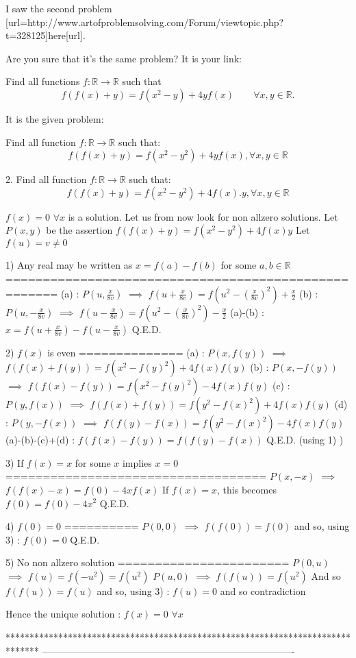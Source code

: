 \begin{solution}
	\begin{tcolorbox}I saw the second problem [url=http://www.artofproblemsolving.com/Forum/viewtopic.php?t=328125]here[\/url].\end{tcolorbox}
Are you sure that it's the same problem?
It is your link:
\begin{tcolorbox}Find all functions $ f: \mathbb R \to \mathbb R$ such that 
\[f(f(x)+y)=f(x^{2}-y)+4yf(x) \qquad \forall x,y \in \mathbb R.\]\end{tcolorbox}
It is the given problem:
\begin{tcolorbox}Find all function $f: \mathbb{R} \to \mathbb{R}$ such that:
\[f(f(x)+y)=f(x^2-y^2)+4yf(x), \forall x,y \in \mathbb{R}\]\end{tcolorbox}
\end{solution}



\begin{solution}
	\begin{tcolorbox}2. Find all function $f: \mathbb{R} \to \mathbb{R}$ such that:
\[f(f(x)+y)=f(x^2-y^2)+4f(x).y, \forall x,y \in \mathbb{R}\]\end{tcolorbox}
$f(x)=0$ $\forall x$ is a solution.
Let us from now look for non allzero solutions.
Let $P(x,y)$ be the assertion $f(f(x)+y)=f(x^2-y^2)+4f(x)y$
Let $f(u)=v\ne 0$

1) Any real may be written as $x=f(a)-f(b)$ for some $a,b\in\mathbb R$
=====================================================
(a) : $P(u,\frac{x}{8v})$ $\implies$ $f(u+\frac{x}{8v})=f(u^2-(\frac{x}{8v})^2)+\frac x2$
(b) : $P(u,-\frac{x}{8v})$ $\implies$ $f(u-\frac{x}{8v})=f(u^2-(\frac{x}{8v})^2)-\frac x2$
(a)-(b) : $x=f(u+\frac{x}{8v})-f(u-\frac{x}{8v})$
Q.E.D.

2) $f(x)$ is even 
==============
(a) : $P(x,f(y))$ $\implies$ $f(f(x)+f(y))=f(x^2-f(y)^2)+4f(x)f(y)$
(b) : $P(x,-f(y))$ $\implies$ $f(f(x)-f(y))=f(x^2-f(y)^2)-4f(x)f(y)$
(c) : $P(y,f(x))$ $\implies$ $f(f(x)+f(y))=f(y^2-f(x)^2)+4f(x)f(y)$
(d) : $P(y,-f(x))$ $\implies$ $f(f(y)-f(x))=f(y^2-f(x)^2)-4f(x)f(y)$
(a)-(b)-(c)+(d) : $f(f(x)-f(y))=f(f(y)-f(x))$
Q.E.D. (using 1) )

3) If $f(x)=x$ for some $x$ implies $x=0$
===================================
$P(x,-x)$ $\implies$ $f(f(x)-x)=f(0)-4xf(x)$
If $f(x)=x$, this becomes $f(0)=f(0)-4x^2$
Q.E.D.

4) $f(0)=0$
==========
$P(0,0)$ $\implies$ $f(f(0))=f(0)$ and so, using 3) : $f(0)=0$
Q.E.D.

5) No non allzero solution
=======================
$P(0,u)$ $\implies$ $f(u)=f(-u^2)=f(u^2)$
$P(u,0)$ $\implies$ $f(f(u))=f(u^2)$
And so $f(f(u))=f(u)$ and so, using 3) : $f(u)=0$ and so contradiction


Hence the unique solution : $\boxed{f(x)=0}$ $\forall x$
\end{solution}
*******************************************************************************
-------------------------------------------------------------------------------

